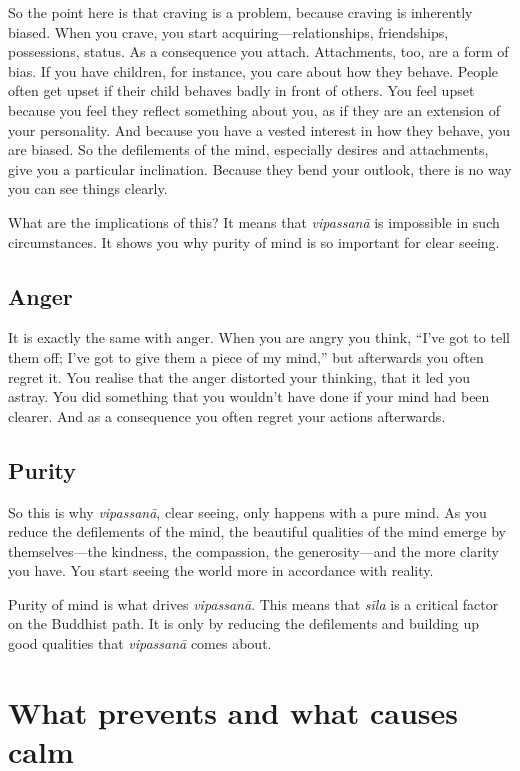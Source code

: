 \documentclass[12pt,openany]{book}
\begin{document}
So the point here is that craving is a problem, because craving is inherently biased. When you crave, you start acquiring—relationships, friendships, possessions, status. As a consequence you attach. Attachments, too, are a form of bias. If you have children, for instance, you care about how they behave. People often get upset if their child behaves badly in front of others. You feel upset because you feel they reflect something about you, as if they are an extension of your personality. And because you have a vested interest in how they behave, you are biased. So the defilements of the mind, especially desires and attachments, give you a particular inclination. Because they bend your outlook, there is no way you can see things clearly.

What are the implications of this? It means that \textit{vipassanā} is impossible in such circumstances. It shows you why purity of mind is so important for clear seeing.

\section*{Anger}

It is exactly the same with anger. When you are angry you think, “I've got to tell them off; I've got to give them a piece of my mind,” but afterwards you often regret it. You realise that the anger distorted your thinking, that it led you astray. You did something that you wouldn’t have done if your mind had been clearer. And as a consequence you often regret your actions afterwards.

\section*{Purity}

So this is why \textit{vipassanā}, clear seeing, only happens with a pure mind. As you reduce the defilements of the mind, the beautiful qualities of the mind emerge by themselves—the kindness, the compassion, the generosity—and the more clarity you have. You start seeing the world more in accordance with reality.

Purity of mind is what drives \textit{vipassanā}. This means that \textit{sīla} is a critical factor on the Buddhist path. It is only by reducing the defilements and building up good qualities that \textit{vipassanā} comes about.

\chapter*{What prevents and what causes calm}
\end{document}
